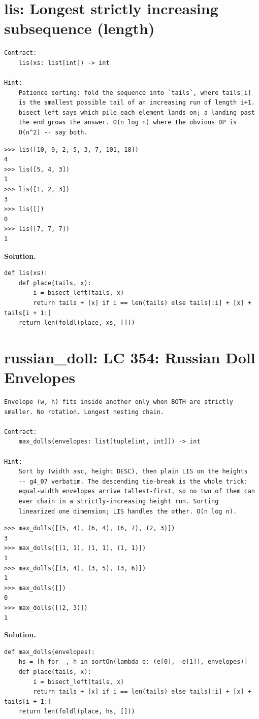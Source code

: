 \documentclass[10pt,letterpaper]{book}
\begin{document}
\section{lis: Longest strictly increasing subsequence (length)}
\begin{lstlisting}[style=ex]
Contract:
    lis(xs: list[int]) -> int

Hint:
    Patience sorting: fold the sequence into `tails`, where tails[i]
    is the smallest possible tail of an increasing run of length i+1.
    bisect_left says which pile each element lands on; a landing past
    the end grows the answer. O(n log n) where the obvious DP is
    O(n^2) -- say both.
\end{lstlisting}
\begin{lstlisting}[style=ex]
>>> lis([10, 9, 2, 5, 3, 7, 101, 18])
4
>>> lis([5, 4, 3])
1
>>> lis([1, 2, 3])
3
>>> lis([])
0
>>> lis([7, 7, 7])
1
\end{lstlisting}
\noindent\textbf{Solution.}
\begin{lstlisting}[style=code]
def lis(xs):
    def place(tails, x):
        i = bisect_left(tails, x)
        return tails + [x] if i == len(tails) else tails[:i] + [x] + tails[i + 1:]
    return len(foldl(place, xs, []))
\end{lstlisting}

\section{russian\_doll: LC 354: Russian Doll Envelopes}
\begin{lstlisting}[style=ex]
Envelope (w, h) fits inside another only when BOTH are strictly
smaller. No rotation. Longest nesting chain.

Contract:
    max_dolls(envelopes: list[tuple[int, int]]) -> int

Hint:
    Sort by (width asc, height DESC), then plain LIS on the heights
    -- g4_07 verbatim. The descending tie-break is the whole trick:
    equal-width envelopes arrive tallest-first, so no two of them can
    ever chain in a strictly-increasing height run. Sorting
    linearized one dimension; LIS handles the other. O(n log n).
\end{lstlisting}
\begin{lstlisting}[style=ex]
>>> max_dolls([(5, 4), (6, 4), (6, 7), (2, 3)])
3
>>> max_dolls([(1, 1), (1, 1), (1, 1)])
1
>>> max_dolls([(3, 4), (3, 5), (3, 6)])
1
>>> max_dolls([])
0
>>> max_dolls([(2, 3)])
1
\end{lstlisting}
\noindent\textbf{Solution.}
\begin{lstlisting}[style=code]
def max_dolls(envelopes):
    hs = [h for _, h in sortOn(lambda e: (e[0], -e[1]), envelopes)]
    def place(tails, x):
        i = bisect_left(tails, x)
        return tails + [x] if i == len(tails) else tails[:i] + [x] + tails[i + 1:]
    return len(foldl(place, hs, []))
\end{lstlisting}
\end{document}
